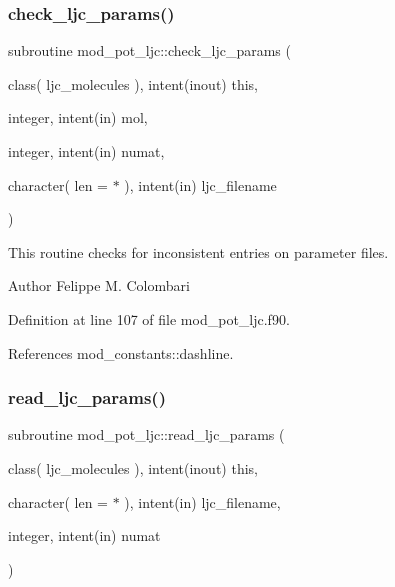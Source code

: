 \mbox{\label{namespacemod__pot__ljc_a1bb4a9e2007633f78e818f7f1d8347b5}} 
\subsubsection{\texorpdfstring{check\+\_\+ljc\+\_\+params()}{check\_ljc\_params()}}
{\footnotesize\ttfamily subroutine mod\+\_\+pot\+\_\+ljc\+::check\+\_\+ljc\+\_\+params (\begin{DoxyParamCaption}\item[{class( ljc\+\_\+molecules ), intent(inout)}]{this,  }\item[{integer, intent(in)}]{mol,  }\item[{integer, intent(in)}]{numat,  }\item[{character( len = $\ast$ ), intent(in)}]{ljc\+\_\+filename }\end{DoxyParamCaption})}



This routine checks for inconsistent entries on parameter files. 

\begin{DoxyAuthor}{Author}
Felippe M. Colombari 
\end{DoxyAuthor}


Definition at line 107 of file mod\+\_\+pot\+\_\+ljc.\+f90.



References mod\+\_\+constants\+::dashline.

\mbox{\label{namespacemod__pot__ljc_aba75dd17c928cdddf564bf03d18b3ee2}} 
\subsubsection{\texorpdfstring{read\+\_\+ljc\+\_\+params()}{read\_ljc\_params()}}
{\footnotesize\ttfamily subroutine mod\+\_\+pot\+\_\+ljc\+::read\+\_\+ljc\+\_\+params (\begin{DoxyParamCaption}\item[{class( ljc\+\_\+molecules ), intent(inout)}]{this,  }\item[{character( len = $\ast$ ), intent(in)}]{ljc\+\_\+filename,  }\item[{integer, intent(in)}]{numat }\end{DoxyParamCaption})}



